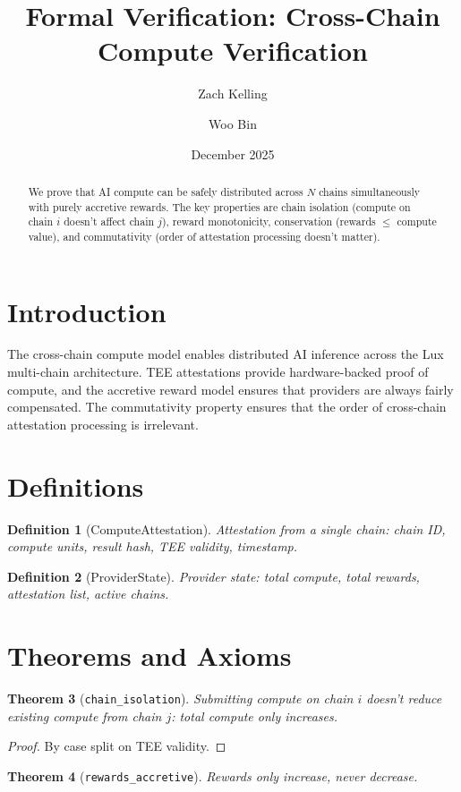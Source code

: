 \documentclass[11pt]{article}
\title{Formal Verification: Cross-Chain Compute Verification}
\author{Zach Kelling \and Woo Bin}
\date{December 2025}
\newtheorem{theorem}{Theorem}
\newtheorem{definition}[theorem]{Definition}
\begin{document}
\maketitle

\begin{abstract}
We prove that AI compute can be safely distributed across $N$ chains simultaneously with purely accretive rewards. The key properties are chain isolation (compute on chain $i$ doesn't affect chain $j$), reward monotonicity, conservation (rewards $\leq$ compute value), and commutativity (order of attestation processing doesn't matter).
\end{abstract}

\section{Introduction}
The cross-chain compute model enables distributed AI inference across the Lux multi-chain architecture. TEE attestations provide hardware-backed proof of compute, and the accretive reward model ensures that providers are always fairly compensated. The commutativity property ensures that the order of cross-chain attestation processing is irrelevant.

\section{Definitions}
\begin{definition}[ComputeAttestation]
Attestation from a single chain: chain ID, compute units, result hash, TEE validity, timestamp.
\end{definition}

\begin{definition}[ProviderState]
Provider state: total compute, total rewards, attestation list, active chains.
\end{definition}


\section{Theorems and Axioms}
\begin{theorem}[\texttt{chain\_isolation}]
Submitting compute on chain $i$ doesn't reduce existing compute from chain $j$: total compute only increases.
\end{theorem}
\begin{proof}
By case split on TEE validity.
\end{proof}

\begin{theorem}[\texttt{rewards\_accretive}]
Rewards only increase, never decrease.
\end{theorem}
\end{document}

